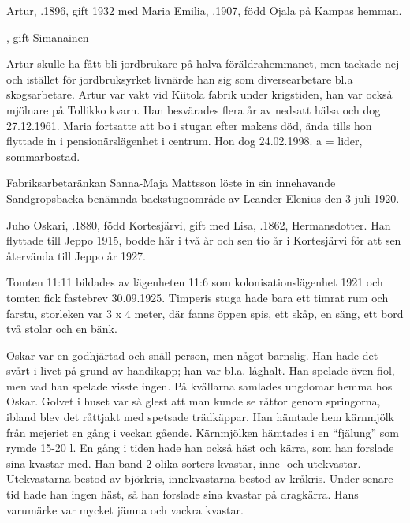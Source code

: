 %
Artur, .1896, gift 1932 med Maria Emilia, .1907, född Ojala på Kampas hemman.
\begin{jhchildren}
  \item {}
  \item {}, gift Simanainen
\end{jhchildren}
Artur skulle ha fått bli jordbrukare på halva föräldrahemmanet, men tackade nej och istället för jordbruksyrket livnärde han sig som diversearbetare bl.a skogsarbetare. Artur var vakt vid Kiitola fabrik under krigstiden, han var också mjölnare på Tollikko kvarn. Han besvärades flera år av nedsatt hälsa och dog 27.12.1961. Maria fortsatte att bo i stugan efter makens död, ända tills hon flyttade in i pensionärslägenhet i centrum. Hon dog 24.02.1998. a = lider, 	sommarbostad.


%
Fabriksarbetaränkan Sanna-Maja Mattsson löste in sin innehavande Sandgropsbacka benämnda backstugoområde av Leander Elenius den 3 juli 1920.\jhvspace{}



%



%
Juho Oskari, .1880, född Kortesjärvi, gift med Lisa, .1862, Hermansdotter. Han flyttade till Jeppo 1915, bodde här i två år och sen tio år i Kortesjärvi för att sen återvända till Jeppo år 1927.

Tomten 11:11 bildades av lägenheten 11:6 som kolonisationslägenhet 1921 och tomten fick fastebrev 30.09.1925. Timperis stuga hade bara ett timrat rum och farstu, storleken var 3 x 4 meter, där fanns öppen spis, ett skåp, en säng, ett bord två stolar och en bänk.

Oskar var en godhjärtad och snäll person, men något barnslig. Han hade det svårt i livet på grund av handikapp; han var bl.a. låghalt. Han spelade även fiol, men vad han spelade visste ingen. På kvällarna samlades ungdomar hemma hos Oskar. Golvet i huset var så glest att man kunde se råttor genom springorna, ibland blev det råttjakt med spetsade trädkäppar. Han hämtade hem kärnmjölk från mejeriet en gång i veckan gående. Kärnmjölken hämtades i en ``fjälung'' som rymde 15-20 l. En gång i tiden hade han också häst och kärra, som han forslade sina kvastar med. Han band 2 olika sorters kvastar, inne- och utekvastar. Utekvastarna bestod av björkris, innekvastarna  bestod av kråkris. Under senare tid hade han ingen häst, så han forslade sina kvastar på dragkärra. Hans varumärke var mycket jämna och vackra kvastar.

